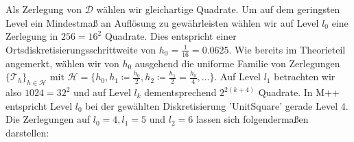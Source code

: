 Als Zerlegung von $ \mathcal{D} $ wählen wir gleichartige Quadrate. Um auf dem geringsten Level ein Mindestmaß an Auflösung zu gewährleisten wählen wir auf Level $ l_0 $ eine Zerlegung in $ 256 = 16^2 $ Quadrate. Dies entspricht einer Ortsdiskretisierungsschrittweite von $ h_0 = \frac{1}{16} = 0.0625 $. Wie bereits im Theorieteil angemerkt, wählen wir von $ h_0 $ ausgehend die uniforme Familie von Zerlegungen $ \{\mathcal{T}_h \}_{h \in \mathcal{H}} $ mit $ \mathcal{H} = \{ h_0 , h_1 \coloneqq \frac{h_0}{2},h_2 \coloneqq \frac{h_1}{2} = \frac{h_0}{4}, \dots \} $. Auf Level $ l_1 $ betrachten wir also $ 1024 = 32^2 $ und auf Level $ l_k $ dementsprechend $ 2^{2(k+4)} $ Quadrate. 
In M++ entspricht Level $ l_0 $ bei der gewählten Diskretisierung 'UnitSquare' gerade Level $ 4 $. Die Zerlegungen auf $ l_0 = 4, l_1 = 5 $ und $ l_2 = 6 $ lassen sich folgendermaßen darstellen:
\begin{figure}[H]
	\centering
\end{figure}
